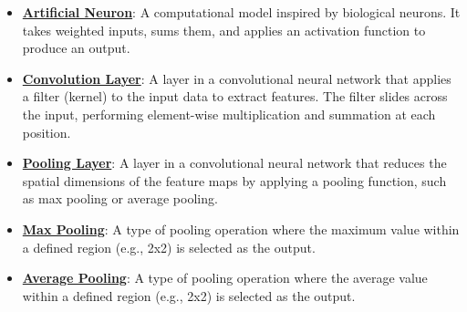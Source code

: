\documentclass{article}%
\begin{document}
\begin{itemize}[leftmargin=*]
\item \href{https://purdue.brightspace.com/d2l/common/assets/pdfjs-d2l-dist/1.0.14-legacy/web/viewer.html?file=\%2Fcontent\%2Fenforced\%2F1095467-wl.202510.CS.24300.001\%2F09L1-cnn.pdf\%3Fou\%3D1095467\&lang=en-us\&container=d2l-fileviewer-rendered-pdf\&fullscreen=d2l-fileviewer-rendered-pdf-dialog\&height=667#page=5}{\textbf{Artificial Neuron}}: A computational model inspired by biological neurons. It takes weighted inputs, sums them, and applies an activation function to produce an output.%
\item \href{https://purdue.brightspace.com/d2l/common/assets/pdfjs-d2l-dist/1.0.14-legacy/web/viewer.html?file=\%2Fcontent\%2Fenforced\%2F1095467-wl.202510.CS.24300.001\%2F09L1-cnn.pdf\%3Fou\%3D1095467\&lang=en-us\&container=d2l-fileviewer-rendered-pdf\&fullscreen=d2l-fileviewer-rendered-pdf-dialog\&height=667#page=6}{\textbf{Convolution Layer}}: A layer in a convolutional neural network that applies a filter (kernel) to the input data to extract features. The filter slides across the input, performing element-wise multiplication and summation at each position.%
\item \href{https://purdue.brightspace.com/d2l/common/assets/pdfjs-d2l-dist/1.0.14-legacy/web/viewer.html?file=\%2Fcontent\%2Fenforced\%2F1095467-wl.202510.CS.24300.001\%2F09L1-cnn.pdf\%3Fou\%3D1095467\&lang=en-us\&container=d2l-fileviewer-rendered-pdf\&fullscreen=d2l-fileviewer-rendered-pdf-dialog\&height=667#page=6}{\textbf{Pooling Layer}}: A layer in a convolutional neural network that reduces the spatial dimensions of the feature maps by applying a pooling function, such as max pooling or average pooling.%
\item \href{https://purdue.brightspace.com/d2l/common/assets/pdfjs-d2l-dist/1.0.14-legacy/web/viewer.html?file=\%2Fcontent\%2Fenforced\%2F1095467-wl.202510.CS.24300.001\%2F09L1-cnn.pdf\%3Fou\%3D1095467\&lang=en-us\&container=d2l-fileviewer-rendered-pdf\&fullscreen=d2l-fileviewer-rendered-pdf-dialog\&height=667#page=15}{\textbf{Max Pooling}}: A type of pooling operation where the maximum value within a defined region (e.g., 2x2) is selected as the output.%
\item \href{https://purdue.brightspace.com/d2l/common/assets/pdfjs-d2l-dist/1.0.14-legacy/web/viewer.html?file=\%2Fcontent\%2Fenforced\%2F1095467-wl.202510.CS.24300.001\%2F09L1-cnn.pdf\%3Fou\%3D1095467\&lang=en-us\&container=d2l-fileviewer-rendered-pdf\&fullscreen=d2l-fileviewer-rendered-pdf-dialog\&height=667#page=15}{\textbf{Average Pooling}}: A type of pooling operation where the average value within a defined region (e.g., 2x2) is selected as the output.%

\end{itemize}
\end{document}
